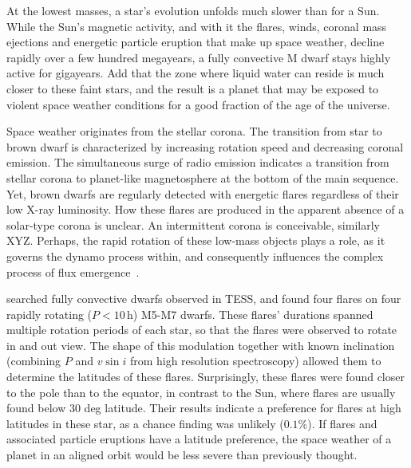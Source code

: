 \documentclass[twocolumn]{aastex631}
\begin{document}
At the lowest masses, a star's evolution unfolds much slower than for a Sun. While the Sun's magnetic activity, and with it the flares, winds, coronal mass ejections and energetic particle eruption that make up space weather, decline rapidly over a few hundred megayears, a fully convective M dwarf stays highly active for gigayears. Add that the zone where liquid water can reside is much closer to these faint stars, and the result is a planet that may be exposed to violent space weather conditions for a good fraction of the age of the universe. 

Space weather originates from the stellar corona. The transition from star to brown dwarf is characterized by increasing rotation speed and decreasing coronal emission. The simultaneous surge of radio emission indicates a transition from stellar corona to planet-like magnetosphere at the bottom of the main sequence. Yet, brown dwarfs are regularly detected with energetic flares regardless of their low X-ray luminosity. How these flares are produced in the apparent absence of a solar-type corona is unclear. An intermittent corona is conceivable, similarly XYZ. Perhaps, the rapid rotation of these low-mass objects plays a role, as it governs the dynamo process within, and consequently influences the complex process of flux emergence~\citep{weber2023understanding}.   

\citet{ilin2021giant} searched fully convective dwarfs observed in TESS, and found four flares on four rapidly rotating ($P<10\,$h) M5-M7 dwarfs. These flares' durations spanned multiple rotation periods of each star, so that the flares were observed to rotate in and out view. The shape of this modulation together with known inclination (combining $P$ and $v \sin i$ from high resolution spectroscopy) allowed them to determine the latitudes of these flares. Surprisingly, these flares were found closer to the pole than to the equator, in contrast to the Sun, where flares are usually found below 30 deg latitude. Their results indicate a preference for flares at high latitudes in these star, as a chance finding was unlikely ($0.1\%$). If flares and associated particle eruptions have a latitude preference, the space weather of a planet in an aligned orbit would be less severe than previously thought. %

\end{document}

